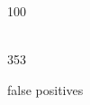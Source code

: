 \documentclass{article}
\begin{document}
\begin{figure}[h]
    \begin{minipage}[h]{0.47\linewidth}
         100 \\
    \end{minipage}
\hfill
    \begin{minipage}[h]{0.47\linewidth}
         \\353
    \end{minipage}
\vfill
    \begin{minipage}[h]{0.47\linewidth}
         false positives \\

\end{minipage}
\end{figure}
\end{document}
